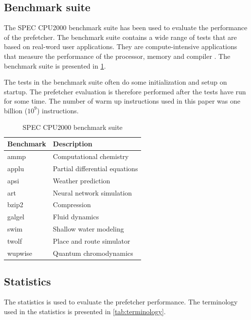 \documentclass[conference]{IEEEtran}
\begin{document}
\subsection{Benchmark suite}
The SPEC CPU2000 benchmark suite has been used to evaluate the performance of the prefetcher. The benchmark suite contains a wide range of tests that are based on real-word user applications. They are compute-intensive applications that measure the performance of the processor, memory and compiler \cite{b8}. The benchmark suite is presented in \cref{tab:benchmarks}. 

The tests in the benchmark suite often do some initialization and setup on startup. The prefetcher evaluation is therefore performed after the tests have run for some time. The number of warm up instructions used in this paper was one billion ($10^9$) instructions. 

\begin{table}[H]
    \centering
    \begin{tabular}{l | p{4cm} }
        Benchmark & Description                    \\
        \hline
        ammp      & Computational chemistry        \\
        applu     & Partial differential equations \\
        apsi      & Weather prediction             \\
        art       & Neural network simulation      \\
        bzip2     & Compression                    \\
        galgel    & Fluid dynamics                 \\
        swim      & Shallow water modeling         \\
        twolf     & Place and route simulator      \\
        wupwise   & Quantum chromodynamics         \\
    \end{tabular}
    \vspace{5mm}
    \caption{SPEC CPU2000 benchmark suite}
    \label{tab:benchmarks}
    \vspace{-5mm}
\end{table}

\subsection{Statistics}

The statistics is used to evaluate the prefetcher performance. The terminology used in the statistics is presented in \cref{tab:terminology}. 
\end{document}
